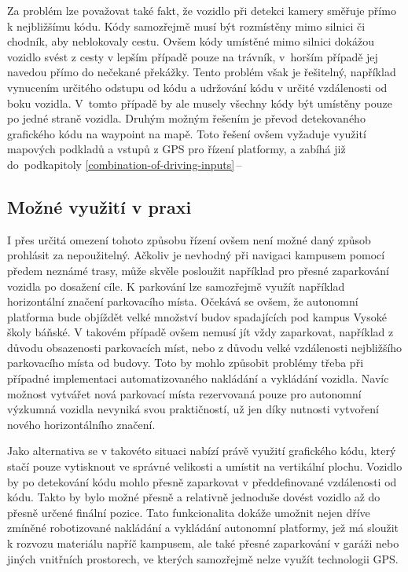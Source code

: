 \documentclass[czech, bachelor]{diploma}
\newcommand{\filipref}[1]{\ref{#1}\,--\,\nameref{#1}}
\begin{document}
Za problém lze považovat také fakt, že vozidlo při detekci kamery směřuje přímo k nejbližšímu kódu. Kódy samozřejmě musí být
rozmístěny mimo silnici či chodník, aby neblokovaly cestu. Ovšem kódy umístěné mimo silnici dokážou vozidlo svést z cesty
v lepším případě pouze na trávník, v~horším případě jej navedou přímo do nečekané překážky. Tento problém však je řešitelný,
například vynucením určitého odstupu od kódu a udržování kódu v určité vzdálenosti od boku vozidla.  V~tomto případě by ale musely
všechny kódy být umístěny pouze po jedné straně vozidla. Druhým možným řešením je převod detekovaného grafického kódu na waypoint
na mapě. Toto řešení ovšem vyžaduje využití mapových podkladů a vstupů z GPS pro řízení platformy, a zabíhá již do~podkapitoly
\filipref{combination-of-driving-inputs}

\subsection{Možné využití v praxi}

I přes určitá omezení tohoto způsobu řízení ovšem není možné daný způsob prohlásit za nepoužitelný. Ačkoliv je nevhodný
při navigaci kampusem pomocí předem neznámé trasy, může skvěle posloužit například pro přesné zaparkování vozidla po dosažení
cíle. K parkování lze samozřejmě využít například horizontální značení parkovacího místa. Očekává se ovšem, že autonomní platforma
bude objíždět velké množství budov spadajících pod kampus Vysoké školy báňské. V takovém případě ovšem nemusí jít vždy zaparkovat,
například z důvodu obsazenosti parkovacích míst, nebo z důvodu velké vzdálenosti nejbližšího parkovacího místa od budovy. Toto by
mohlo způsobit problémy třeba při případné implementaci automatizovaného nakládání a vykládání vozidla. Navíc možnost vytvářet
nová parkovací místa rezervovaná pouze pro autonomní výzkumná vozidla nevyniká svou praktičností, už jen díky nutnosti vytvoření
nového horizontálního značení.

Jako alternativa se v takovéto situaci nabízí právě využití grafického kódu, který stačí pouze vytisknout ve správné velikosti
a umístit na vertikální plochu. Vozidlo by po detekování kódu mohlo přesně zaparkovat v předdefinované vzdálenosti od kódu. Takto
by bylo možné přesně a relativně jednoduše dovést vozidlo až do přesně určené finální pozice. Tato funkcionalita dokáže umožnit
nejen dříve zmíněné robotizované nakládání a vykládání autonomní platformy, jež má sloužit k rozvozu materiálu napříč kampusem,
ale také přesné zaparkování v garáži nebo jiných vnitřních prostorech, ve kterých samozřejmě nelze využít technologii GPS.
\end{document}
